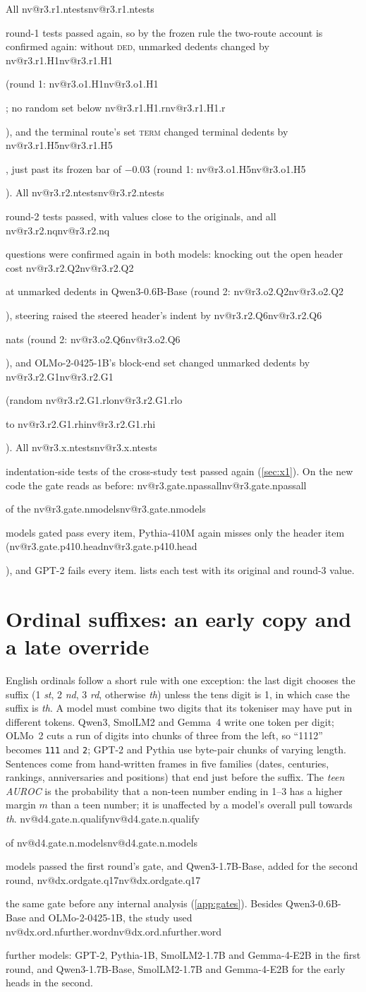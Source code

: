 \documentclass[11pt]{article}
\makeatletter
\newcommand{\nv}[1]{\ifcsname nv@#1\endcsname\csname nv@#1\endcsname\else\PackageError{numbers}{Unknown number key #1}{}\fi}
\newcommand{\sfx}[1]{\textit{#1}}
\newcommand{\ded}{\textsc{ded}}
\newcommand{\term}{\textsc{term}}
\newcommand{\qsix}{Qwen3-0.6B-Base}
\newcommand{\qbig}{Qwen3-1.7B-Base}
\newcommand{\olmo}{OLMo-2-0425-1B}
\newcommand{\gm}{Gemma-4-E2B}
\makeatother
\begin{document}
All \nv{r3.r1.ntests} round-1 tests passed again, so by the frozen rule the two-route account is confirmed again: without \ded{}, unmarked dedents changed by \nv{r3.r1.H1} (round 1: \nv{r3.o1.H1}; no random set below \nv{r3.r1.H1.r}), and the terminal route's set \term{} changed terminal dedents by \nv{r3.r1.H5}, just past its frozen bar of $-0.03$ (round 1: \nv{r3.o1.H5}). All \nv{r3.r2.ntests} round-2 tests passed, with values close to the originals, and all \nv{r3.r2.nq} questions were confirmed again in both models: knocking out the open header cost \nv{r3.r2.Q2} at unmarked dedents in \qsix{} (round 2: \nv{r3.o2.Q2}), steering raised the steered header's indent by \nv{r3.r2.Q6} nats (round 2: \nv{r3.o2.Q6}), and \olmo{}'s block-end set changed unmarked dedents by \nv{r3.r2.G1} (random \nv{r3.r2.G1.rlo} to \nv{r3.r2.G1.rhi}). All \nv{r3.x.ntests} indentation-side tests of the cross-study test passed again (\cref{sec:x1}). On the new code the gate reads as before: \nv{r3.gate.npassall} of the \nv{r3.gate.nmodels} models gated pass every item, Pythia-410M again misses only the header item (\nv{r3.gate.p410.head}), and GPT-2 fails every item.  lists each test with its original and round-3 value.

\section{Ordinal suffixes: an early copy and a late override}
\label{sec:ord}

English ordinals follow a short rule with one exception: the last digit chooses the suffix (1 \sfx{st}, 2 \sfx{nd}, 3 \sfx{rd}, otherwise \sfx{th}) unless the tens digit is 1, in which case the suffix is \sfx{th}. A model must combine two digits that its tokeniser may have put in different tokens. Qwen3, SmolLM2 and Gemma~4 write one token per digit; OLMo~2 cuts a run of digits into chunks of three from the left, so ``1112'' becomes \texttt{111} and \texttt{2}; GPT-2 and Pythia use byte-pair chunks of varying length. Sentences come from hand-written frames in five families (dates, centuries, rankings, anniversaries and positions) that end just before the suffix. The \emph{teen AUROC} is the probability that a non-teen number ending in 1--3 has a higher margin $m$ than a teen number; it is unaffected by a model's overall pull towards \sfx{th}. \nv{d4.gate.n.qualify} of \nv{d4.gate.n.models} models passed the first round's gate, and \qbig{}, added for the second round, \nv{dx.ordgate.q17} the same gate before any internal analysis (\cref{app:gates}). Besides \qsix{} and \olmo{}, the study used \nv{dx.ord.nfurther.word} further models: GPT-2, Pythia-1B, SmolLM2-1.7B and \gm{} in the first round, and \qbig{}, SmolLM2-1.7B and \gm{} for the early heads in the second.
\end{document}
